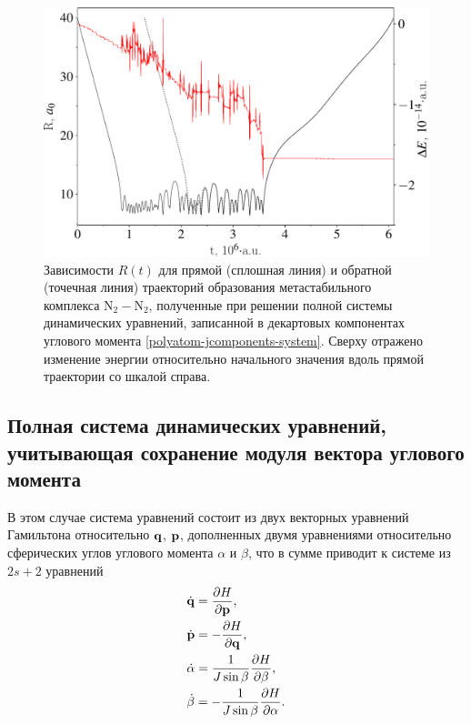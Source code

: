 \begin{figure}[H]
    \centering
    \includegraphics[width=0.85\linewidth]{./pictures/trajectories/jcomponents-trajectory-crop.pdf}
    \caption{Зависимости $R(t)$ для прямой (сплошная линия) и обратной (точечная линия) траекторий образования метастабильного комплекса N$_2-$N$_2$, полученные при решении полной системы динамических уравнений, записанной в декартовых компонентах углового момента \eqref{polyatom-jcomponents-system}. Сверху отражено изменение энергии относительно начального значения вдоль прямой траектории со шкалой справа.}
    \label{fig:jcomponents-trajectory}
\end{figure}


\subsection{Полная система динамических уравнений, учитывающая сохранение модуля вектора углового момента}
В этом случае система уравнений состоит из двух векторных уравнений Гамильтона относительно $\mathbf{q}$, $\mathbf{p}$, дополненных двумя уравнениями относительно сферических углов углового момента $\alpha$ и $\beta$, что в сумме приводит к системе из $2s + 2$ уравнений
\begin{gather}
    \begin{aligned}
        &\dot{\mathbf{q}} = \frac{\partial H}{\partial \mathbf{p}}, \\
        &\dot{\mathbf{p}} = -\frac{\partial H}{\partial \mathbf{q}}, \\
        &\dot{\alpha} = \frac{1}{J \sin \beta} \frac{\partial H}{\partial \beta}, \\
        &\dot{\beta} = -\frac{1}{J \sin \beta} \frac{\partial H}{\partial \alpha}.
    \end{aligned}
\end{gather}

